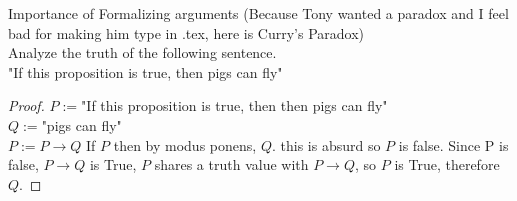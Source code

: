 \vspace{3cm}

\begin{exmp}{Importance of Formalizing arguments}
(Because Tony wanted a paradox and I feel bad for making him type in .tex, here is Curry's Paradox)\\

Analyze the truth of the following sentence.\\

"If this proposition is true, then pigs can fly"\\
\end{exmp}
\begin{proof}
$P:=$"If this proposition is true, then then pigs can fly"\\
$Q:=$"pigs can fly"\\
$P:=P\to Q$
If $P$ then by modus ponens, $Q$. this is absurd so $P$ is false. Since P is false, $P\to Q$ is True, $P$ shares a truth value with $P\to Q$, so $P$ is True, therefore $Q$.
\end{proof}



\newpage
